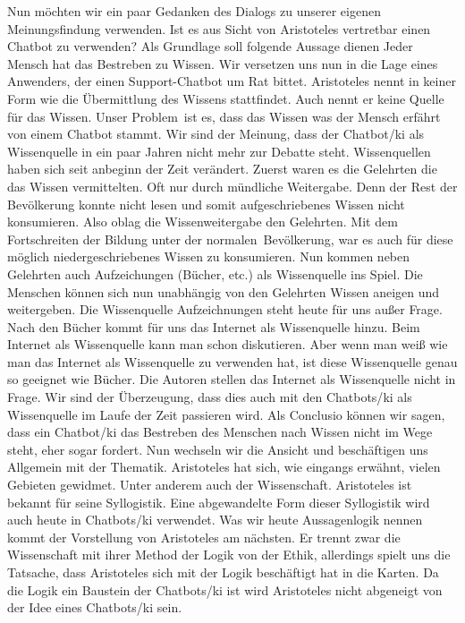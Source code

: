Nun möchten wir ein paar Gedanken des Dialogs zu unserer eigenen Meinungsfindung verwenden. Ist es aus Sicht von Aristoteles vertretbar einen Chatbot zu verwenden? Als Grundlage soll folgende Aussage dienen \glqq Jeder Mensch hat das Bestreben zu Wissen\grqq. Wir versetzen uns nun in die Lage eines Anwenders, der einen Support-Chatbot um Rat bittet. Aristoteles nennt in keiner Form wie die Übermittlung des Wissens stattfindet. Auch nennt er keine Quelle für das Wissen. Unser \glqq Problem\grqq\ ist es, dass das Wissen was der Mensch erfährt von einem Chatbot stammt. Wir sind der Meinung, dass der Chatbot/\ac{ki} als Wissenquelle in ein paar Jahren nicht mehr zur Debatte steht. Wissenquellen haben sich seit anbeginn der Zeit verändert. Zuerst waren es die Gelehrten die das Wissen vermittelten. Oft nur durch mündliche Weitergabe. Denn der Rest der Bevölkerung konnte nicht lesen und somit aufgeschriebenes Wissen nicht konsumieren. Also oblag die Wissenweitergabe den Gelehrten. Mit dem Fortschreiten der Bildung unter der \glqq normalen\grqq\ Bevölkerung, war es auch für diese möglich niedergeschriebenes Wissen zu konsumieren. Nun kommen neben Gelehrten auch Aufzeichungen (Bücher, etc.) als Wissenquelle ins Spiel. Die Menschen können sich nun unabhängig von den Gelehrten Wissen aneigen und weitergeben. Die Wissenquelle Aufzeichnungen steht heute für uns außer Frage. Nach den Bücher kommt für uns das Internet als Wissenquelle hinzu. Beim Internet als Wissenquelle kann man schon diskutieren. Aber wenn man weiß wie man das Internet als Wissenquelle zu verwenden hat, ist diese Wissenquelle genau so geeignet wie Bücher. Die Autoren stellen das Internet als Wissenquelle nicht in Frage. Wir sind der Überzeugung, dass dies auch mit den Chatbots/\ac{ki} als Wissenquelle im Laufe der Zeit passieren wird. Als Conclusio können wir sagen, dass ein Chatbot/\ac{ki} das Bestreben des Menschen nach Wissen nicht im Wege steht, eher sogar fordert. \newline
Nun wechseln wir die Ansicht und beschäftigen uns Allgemein mit der Thematik. Aristoteles hat sich, wie eingangs erwähnt, vielen Gebieten gewidmet. Unter anderem auch der Wissenschaft. Aristoteles ist bekannt für seine Syllogistik. Eine abgewandelte Form dieser Syllogistik wird auch heute in Chatbots/\ac{ki} verwendet. Was wir heute Aussagenlogik nennen kommt der Vorstellung von Aristoteles am nächsten. Er trennt zwar die Wissenschaft mit ihrer Method der Logik von der Ethik, allerdings spielt uns die Tatsache, dass Aristoteles sich mit der Logik beschäftigt hat in die Karten. Da die Logik ein Baustein der Chatbots/\ac{ki} ist wird Aristoteles nicht abgeneigt von der Idee eines Chatbots/\ac{ki} sein. \newline
